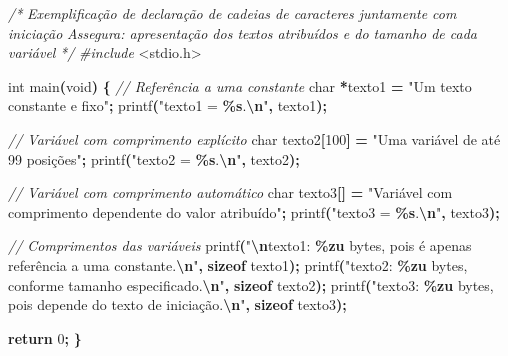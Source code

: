 \documentclass[
  11pt,
  a4paper,
]{scrbook}
\newenvironment{Shaded}{\begin{snugshade}}{\end{snugshade}}
\newcommand{\CommentTok}[1]{\textcolor[rgb]{0.56,0.35,0.01}{\textit{#1}}}
\newcommand{\ControlFlowTok}[1]{\textcolor[rgb]{0.13,0.29,0.53}{\textbf{#1}}}
\newcommand{\DataTypeTok}[1]{\textcolor[rgb]{0.13,0.29,0.53}{#1}}
\newcommand{\DecValTok}[1]{\textcolor[rgb]{0.00,0.00,0.81}{#1}}
\newcommand{\ImportTok}[1]{#1}
\newcommand{\KeywordTok}[1]{\textcolor[rgb]{0.13,0.29,0.53}{\textbf{#1}}}
\newcommand{\NormalTok}[1]{#1}
\newcommand{\OperatorTok}[1]{\textcolor[rgb]{0.81,0.36,0.00}{\textbf{#1}}}
\newcommand{\PreprocessorTok}[1]{\textcolor[rgb]{0.56,0.35,0.01}{\textit{#1}}}
\newcommand{\SpecialCharTok}[1]{\textcolor[rgb]{0.81,0.36,0.00}{\textbf{#1}}}
\newcommand{\StringTok}[1]{\textcolor[rgb]{0.31,0.60,0.02}{#1}}
\begin{document}
\begin{Shaded}
\begin{Highlighting}[]
\CommentTok{/*}
\CommentTok{Exemplificação de declaração de cadeias de caracteres juntamente com iniciação}
\CommentTok{Assegura: apresentação dos textos atribuídos e do tamanho de cada variável}
\CommentTok{*/}
\PreprocessorTok{\#include }\ImportTok{\textless{}stdio.h\textgreater{}}

\DataTypeTok{int}\NormalTok{ main}\OperatorTok{(}\DataTypeTok{void}\OperatorTok{)} \OperatorTok{\{}
    \CommentTok{// Referência a uma constante}
    \DataTypeTok{char} \OperatorTok{*}\NormalTok{texto1 }\OperatorTok{=} \StringTok{"Um texto constante e fixo"}\OperatorTok{;}
\NormalTok{    printf}\OperatorTok{(}\StringTok{"texto1 = \textquotesingle{}}\SpecialCharTok{\%s}\StringTok{\textquotesingle{}.}\SpecialCharTok{\textbackslash{}n}\StringTok{"}\OperatorTok{,}\NormalTok{ texto1}\OperatorTok{);}

    \CommentTok{// Variável com comprimento explícito}
    \DataTypeTok{char}\NormalTok{ texto2}\OperatorTok{[}\DecValTok{100}\OperatorTok{]} \OperatorTok{=} \StringTok{"Uma variável de até 99 posições"}\OperatorTok{;}
\NormalTok{    printf}\OperatorTok{(}\StringTok{"texto2 = \textquotesingle{}}\SpecialCharTok{\%s}\StringTok{\textquotesingle{}.}\SpecialCharTok{\textbackslash{}n}\StringTok{"}\OperatorTok{,}\NormalTok{ texto2}\OperatorTok{);}

    \CommentTok{// Variável com comprimento automático}
    \DataTypeTok{char}\NormalTok{ texto3}\OperatorTok{[]} \OperatorTok{=} \StringTok{"Variável com comprimento dependente do valor atribuído"}\OperatorTok{;}
\NormalTok{    printf}\OperatorTok{(}\StringTok{"texto3 = \textquotesingle{}}\SpecialCharTok{\%s}\StringTok{\textquotesingle{}.}\SpecialCharTok{\textbackslash{}n}\StringTok{"}\OperatorTok{,}\NormalTok{ texto3}\OperatorTok{);}

    \CommentTok{// Comprimentos das variáveis}
\NormalTok{    printf}\OperatorTok{(}\StringTok{"}\SpecialCharTok{\textbackslash{}n}\StringTok{texto1: }\SpecialCharTok{\%zu}\StringTok{ bytes, pois é apenas referência a uma constante.}\SpecialCharTok{\textbackslash{}n}\StringTok{"}\OperatorTok{,}
           \KeywordTok{sizeof}\NormalTok{ texto1}\OperatorTok{);}
\NormalTok{    printf}\OperatorTok{(}\StringTok{"texto2: }\SpecialCharTok{\%zu}\StringTok{ bytes, conforme tamanho especificado.}\SpecialCharTok{\textbackslash{}n}\StringTok{"}\OperatorTok{,}
           \KeywordTok{sizeof}\NormalTok{ texto2}\OperatorTok{);}
\NormalTok{    printf}\OperatorTok{(}\StringTok{"texto3: }\SpecialCharTok{\%zu}\StringTok{ bytes, pois depende do texto de iniciação.}\SpecialCharTok{\textbackslash{}n}\StringTok{"}\OperatorTok{,}
           \KeywordTok{sizeof}\NormalTok{ texto3}\OperatorTok{);}

    \ControlFlowTok{return} \DecValTok{0}\OperatorTok{;}
\OperatorTok{\}}
\end{Highlighting}
\end{Shaded}
\end{document}
